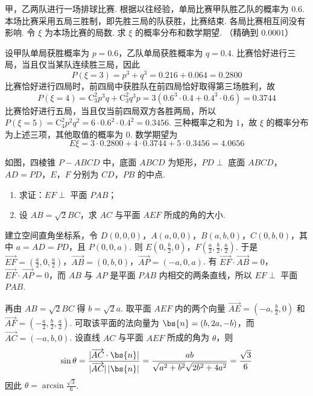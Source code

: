 \begin{problem}
甲，乙两队进行一场排球比赛. 根据以往经验，单局比赛甲队胜乙队的概率为 \(0.6\). 本场比赛采用五局三胜制，即先胜三局的队获胜，比赛结束. 各局比赛相互间没有影响. 令 \(\xi\) 为本场比赛的局数. 求 \(\xi\) 的概率分布和数学期望. （精确到 \(0.0001\)）
\end{problem}

\begin{solution}
设甲队单局获胜概率为 \(p=0.6\)，乙队单局获胜概率为 \(q=0.4\). 比赛恰好进行三局，当且仅当某队连续胜三局，因此
\[
P(\xi=3)=p^3+q^3=0.216+0.064=0.2800
\]
比赛恰好进行四局时，前四局中获胜队在前四局恰好取得第三场胜利，故
\[
P(\xi=4)=\mathrm C_3^2p^3q+\mathrm C_3^2q^3p=3(0.6^3\cdot0.4+0.4^3\cdot0.6)=0.3744
\]
比赛恰好进行五局，当且仅当前四局双方各胜两局，所以 \(P(\xi=5)=\mathrm C_4^2p^2q^2=6\cdot0.6^2\cdot0.4^2=0.3456\).
三种概率之和为 \(1\)，故 \(\xi\) 的概率分布为上述三项，其他取值的概率为 \(0\). 数学期望为
\[
E\xi=3\cdot0.2800+4\cdot0.3744+5\cdot0.3456=4.0656
\]
\end{solution}

\begin{problem}
如图，四棱锥 \(P - ABCD\) 中，底面 \(ABCD\) 为矩形，\(PD \perp\) 底面 \(ABCD\)，\(AD = PD\)，\(E\)，\(F\) 分别为 \(CD\)，\(PB\) 的中点.

\begin{enumerate}
\item 求证：\(EF \perp\) 平面 \(PAB\)；
\item 设 \(AB = \sqrt{2}BC\)，求 \(AC\) 与平面 \(AEF\) 所成的角的大小.
\end{enumerate}

\end{problem}

\begin{solution}
建立空间直角坐标系，令 \(D(0,0,0)\)，\(A(a,0,0)\)，\(B(a,b,0)\)，\(C(0,b,0)\)，其中 \(a=AD=PD\)，且 \(P(0,0,a)\). 则 \(E\left(0,\frac b2,0\right)\)，\(F\left(\frac a2,\frac b2,\frac a2\right)\).
于是 \(\overrightarrow{EF}=\left(\frac a2,0,\frac a2\right)\)，\(\overrightarrow{AB}=(0,b,0)\)，\(\overrightarrow{AP}=(-a,0,a)\). 有 \(\overrightarrow{EF}\cdot\overrightarrow{AB}=0\)，\(\overrightarrow{EF}\cdot\overrightarrow{AP}=0\)，而 \(AB\) 与 \(AP\) 是平面 \(PAB\) 内相交的两条直线，所以 \(EF\perp\) 平面 \(PAB\).

再由 \(AB=\sqrt2BC\) 得 \(b=\sqrt2a\). 取平面 \(AEF\) 内的两个向量 \(\overrightarrow{AE}=\left(-a,\frac b2,0\right)\) 和 \(\overrightarrow{AF}=\left(-\frac a2,\frac b2,\frac a2\right)\).
可取该平面的法向量为 \(\bs{n}=(b,2a,-b)\)，而 \(\overrightarrow{AC}=(-a,b,0)\). 设直线 \(AC\) 与平面 \(AEF\) 所成的角为 \(\theta\)，则
\[
\sin\theta=\frac{|\overrightarrow{AC}\cdot\bs{n}|}{|\overrightarrow{AC}|\,|\bs{n}|}=\frac{ab}{\sqrt{a^2+b^2}\sqrt{2b^2+4a^2}}=\frac{\sqrt3}{6}
\]
因此 \(\theta=\arcsin\frac{\sqrt3}{6}\).
\end{solution}

